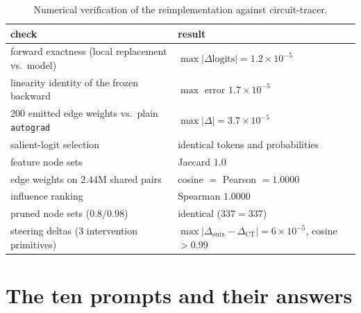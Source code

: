 \documentclass[11pt,a4paper]{article}
\begin{document}
\begin{table}[h]
\centering\small
\begin{tabular}{ll}
\toprule
check & result \\
\midrule
forward exactness (local replacement vs.\ model) & $\max|\Delta\text{logits}| = 1.2\times10^{-5}$ \\
linearity identity of the frozen backward & $\max$ error $1.7\times10^{-5}$ \\
200 emitted edge weights vs.\ plain \texttt{autograd} & $\max|\Delta| = 3.7\times10^{-5}$ \\
salient-logit selection & identical tokens and probabilities \\
feature node sets & Jaccard $1.0$ \\
edge weights on $2.44$M shared pairs & cosine $=$ Pearson $= 1.0000$ \\
influence ranking & Spearman $1.0000$ \\
pruned node sets ($0.8/0.98$) & identical ($337 = 337$) \\
steering deltas (3 intervention primitives) & $\max|\Delta_\text{ours}-\Delta_\text{CT}| = 6\times10^{-5}$, cosine $>0.99$ \\
\bottomrule
\end{tabular}
\caption{Numerical verification of the reimplementation against circuit-tracer.}
\label{tab:verification}
\end{table}

\clearpage
\section{The ten prompts and their answers}\label{app:behaviour}
\end{document}
